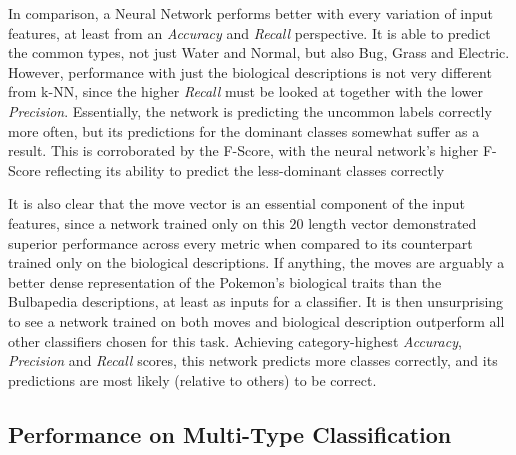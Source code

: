\documentclass{winnower}
\begin{document}
In comparison, a Neural Network performs better with every variation of input features, at least from an \textit{Accuracy} and \textit{Recall} perspective. It is able to predict the common types, not just Water and Normal, but also Bug, Grass and Electric. However, performance with just the biological descriptions is not very different from k-NN, since the higher \textit{Recall} must be looked at together with the lower \textit{Precision}. Essentially, the network is predicting the uncommon labels correctly more often, but its predictions for the dominant classes somewhat suffer as a result. This is corroborated by the F-Score, with the neural network's higher F-Score reflecting its ability to predict the less-dominant classes correctly

It is also clear that the move vector is an essential component of the input features, since a network trained only on this $20$ length vector demonstrated superior performance across every metric when compared to its counterpart trained only on the biological descriptions. If anything, the moves are arguably a better dense representation of the Pokemon's biological traits than the Bulbapedia descriptions, at least as inputs for a classifier. It is then unsurprising to see a network trained on both moves and biological description outperform all other classifiers chosen for this task. Achieving category-highest \textit{Accuracy}, \textit{Precision} and \textit{Recall} scores, this network predicts more classes correctly, and its predictions are most likely (relative to others) to be correct.  

\subsection{Performance on Multi-Type Classification}
\end{document}
